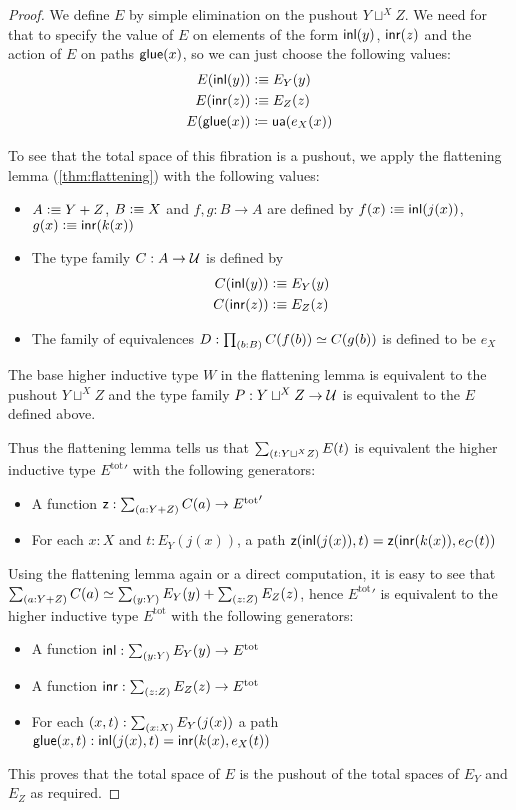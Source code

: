 \begin{proof}
  We define $E$ by simple elimination on the pushout $Y\sqcup^XZ$. We need for
  that to specify the value of $E$ on elements of the form ${\mathsf{inl}}(y)$, ${\mathsf{inr}}(z)$
  and the action of $E$ on paths $\mathsf{glue}(x)$, so we can just choose the following
  values:
  \begin{align*}
    E({\mathsf{inl}}(y)) & \vcentcolon\equiv E_Y(y)\\
    E({\mathsf{inr}}(z)) & \vcentcolon\equiv E_Z(z)\\
    {E}\mathopen{}\left({\mathsf{glue}(x)}\right)\mathclose{} & \coloneqq \mathsf{ua}(e_X(x))
  \end{align*}

  To see that the total space of this fibration is a pushout, we apply the
  flattening lemma (\autoref{thm:flattening}) with the following values:
  \begin{itemize}
  \item $A\vcentcolon\equiv Y+Z$, $B\vcentcolon\equiv X$ and $f,g:B\to A$ are defined by
    $f(x)\vcentcolon\equiv{\mathsf{inl}}(j(x))$, $g(x)\vcentcolon\equiv{\mathsf{inr}}(k(x))$
  \item The type family $C:A\to\mathcal{U}$ is defined by
    \begin{align*}
      C({\mathsf{inl}}(y)) & \vcentcolon\equiv E_Y(y)\\
      C({\mathsf{inr}}(z)) & \vcentcolon\equiv E_Z(z)
    \end{align*}
  \item The family of equivalences $D:\prd{b:B}C(f(b))\simeq C(g(b))$ is defined
    to be $e_X$
  \end{itemize}

  The base higher inductive type $W$ in the flattening lemma is equivalent to
  the pushout $Y\sqcup^XZ$ and the type family $P:Y\sqcup^XZ\to\mathcal{U}$ is
  equivalent to the $E$ defined above.

  Thus the flattening lemma tells us that $\sm{t:Y\sqcup^XZ}E(t)$ is equivalent
  the higher inductive type ${E^{\mathrm{tot}}}'$ with the following generators:
  \begin{itemize}
  \item A function $\mathsf{z}:\sm{a:Y+Z}C(a)\to {E^{\mathrm{tot}}}'$
  \item For each $x:X$ and $t:E_Y(j(x))$, a path
    $\mathsf{z}({\mathsf{inl}}(j(x)),t)=\mathsf{z}({\mathsf{inr}}(k(x)),e_C(t))$
  \end{itemize}

  Using the flattening lemma again or a direct computation, it is easy to see
  that $\eqv{\sm{a:Y+Z}C(a)}{\sm{y:Y}E_Y(y)+\sm{z:Z}E_Z(z)}$, hence
  ${E^{\mathrm{tot}}}'$ is equivalent to the higher inductive type
  $E^{\mathrm{tot}}$ with the following generators:
  \begin{itemize}
  \item A function $\inl:\sm{y:Y}E_Y(y)\to E^{\mathrm{tot}}$
  \item A function $\inr:\sm{z:Z}E_Z(z)\to E^{\mathrm{tot}}$
  \item For each $(x,t):\sm{x:X}E_Y(j(x))$ a path $\mathsf{glue}(x,t):{\mathsf{inl}}(j(x),t) =
    {\mathsf{inr}}(k(x),e_X(t))$
  \end{itemize}

  This proves that the total space of $E$ is the pushout of the total spaces of
  $E_Y$ and $E_Z$ as required.
\end{proof}

